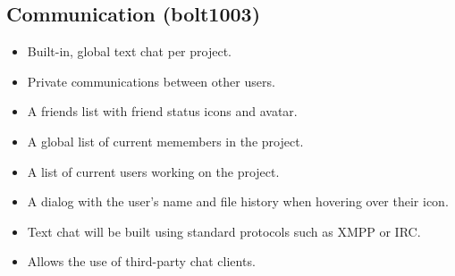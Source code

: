 \documentclass[11pt]{report}
\begin{document}
    \subsection{Communication (bolt1003)}
        \begin{itemize}
            \item Built-in, global text chat per project.
            \item Private communications between other users.
            \item A friends list with friend status icons and avatar.
            \item A global list of current memembers in the project.
            \item A list of current users working on the project.
            \item A dialog with the user's name and file history when hovering over their icon.
            \item Text chat will be built using standard protocols such as XMPP or IRC.
            \item Allows the use of third-party chat clients.
        \end{itemize}
\end{document}
